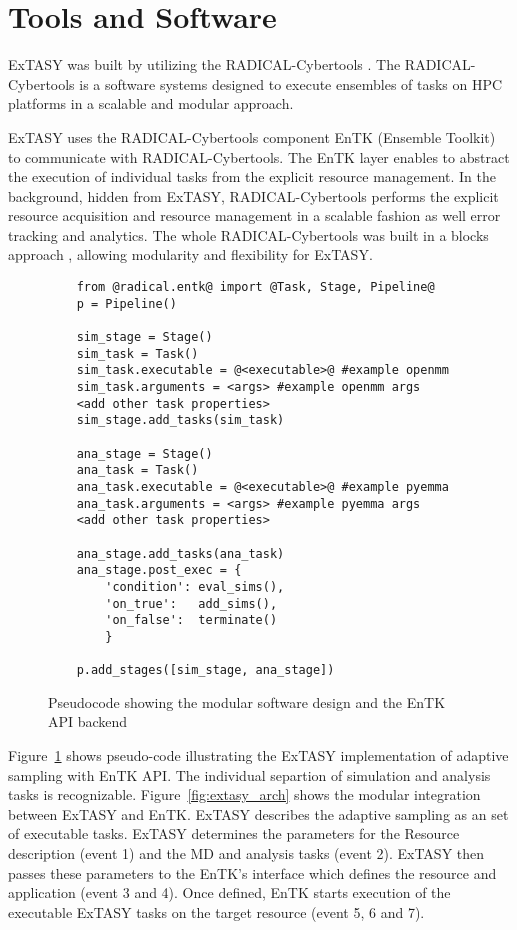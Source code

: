 {\section{\label{sec:Tools}Tools and Software}

ExTASY was built by utilizing the RADICAL-Cybertools \cite{Balasubramanian2019rct}. The RADICAL-Cybertools is a software systems designed to execute ensembles of tasks on HPC platforms in a scalable and modular approach.

ExTASY uses the RADICAL-Cybertools component EnTK (Ensemble Toolkit)
\cite{entk-icpp-2016, balasubramanian2018harnessing} to communicate with RADICAL-Cybertools. The EnTK layer enables to abstract the execution of individual tasks from the explicit resource
management. In the background, hidden from ExTASY, RADICAL-Cybertools performs the explicit resource acquisition and resource management in a scalable fashion as well error tracking and analytics. The whole RADICAL-Cybertools was built in a blocks approach \cite{turilli2018building}, allowing modularity and flexibility for ExTASY.


\begin{figure}[h!]
    \begin{lstlisting}
    from @radical.entk@ import @Task, Stage, Pipeline@
    p = Pipeline()

    sim_stage = Stage()   
    sim_task = Task()
    sim_task.executable = @<executable>@ #example openmm
    sim_task.arguments = <args> #example openmm args
    <add other task properties>
    sim_stage.add_tasks(sim_task)
    
    ana_stage = Stage()
    ana_task = Task()
    ana_task.executable = @<executable>@ #example pyemma
    ana_task.arguments = <args> #example pyemma args
    <add other task properties>
    
    ana_stage.add_tasks(ana_task)
    ana_stage.post_exec = {
        'condition': eval_sims(),
        'on_true':   add_sims(),
        'on_false':  terminate()
        }
    
    p.add_stages([sim_stage, ana_stage])
    \end{lstlisting}
    \caption{Pseudocode showing the modular software design and the EnTK API backend}\label{extasy_snippet}
\end{figure}


Figure~\ref{extasy_snippet} shows pseudo-code illustrating the ExTASY implementation of adaptive sampling with EnTK API. The individual separtion of simulation and analysis tasks is recognizable. Figure~\ref{fig:extasy_arch} shows the modular integration between ExTASY and EnTK. ExTASY describes the adaptive sampling as an set of executable tasks. ExTASY determines the parameters for the Resource description (event 1) and the MD and analysis tasks (event 2). ExTASY then passes these parameters to the EnTK's interface which defines the resource and application (event 3 and 4). Once defined, EnTK starts execution of the executable ExTASY tasks on the target resource (event 5, 6 and 7). 

}
